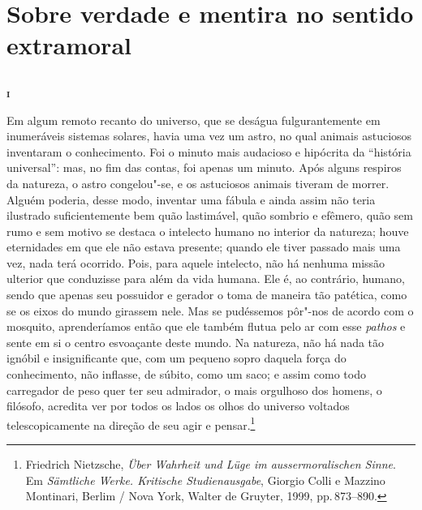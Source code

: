 \part[Sobre verdade e mentira]{Sobre verdade e mentira no sentido extramoral} %

\chapter*{}

\textsc{\textbf{i}}
\bigskip

Em algum remoto recanto do universo, que se deságua fulgurantemente em
inumeráveis sistemas solares, havia uma vez um astro, no qual animais
astuciosos inventaram o conhecimento. Foi o minuto mais audacioso e
hipócrita da “história universal”: mas, no fim das contas, foi apenas
um minuto. Após alguns respiros da natureza, o astro congelou"-se, e
os astuciosos animais tiveram de morrer. Alguém poderia, desse modo,
inventar uma fábula e ainda assim não teria ilustrado suficientemente
bem quão lastimável, quão sombrio e efêmero, quão sem rumo e sem motivo
se destaca o intelecto humano no interior da natureza; houve
eternidades em que ele não estava presente; quando ele tiver passado
mais uma vez, nada terá ocorrido. Pois, para aquele intelecto, não há
nenhuma missão ulterior que conduzisse para além da vida humana. Ele é,
ao contrário, humano, sendo que apenas seu possuidor e gerador o toma
de maneira tão patética, como se os eixos do mundo girassem nele. 
Mas se pudéssemos pôr"-nos de acordo com o mosquito, aprenderíamos então
que ele também flutua pelo ar com esse \textit{pathos} e sente em si o
centro esvoaçante deste mundo. Na natureza, não há nada tão ignóbil e
insignificante que, com um pequeno sopro daquela força do conhecimento,
não inflasse, de súbito, como um saco; e assim como todo carregador de
peso quer ter seu admirador, o mais orgulhoso dos homens, o filósofo,
acredita ver por todos os lados os olhos do universo voltados
telescopicamente na direção de seu agir e pensar.\footnote{Friedrich Nietzsche,
\textit{Über Wahrheit und Lüge im aussermoralischen Sinne}.
Em \textit{Sämtliche Werke. Kritische Studienausgabe},
Giorgio Colli e Mazzino Montinari, Berlim / Nova
York, Walter de Gruyter, 1999, pp.\,873--890.}

